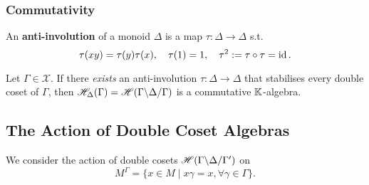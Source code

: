 \subsubsection{Commutativity}
An \textbf{anti-involution} of a monoid $\Delta$
is a map $\tau : \Delta\to\Delta$ s.t. \[\tau(xy) = \tau(y)\tau(x),\quad \tau(1) = 1,\quad \tau^2 := \tau\circ\tau = \operatorname{id}.\]
\begin{theorem}\label{hecke alg comm if anti involution}
    Let $\Gamma\in\mathscr{X}$.
    If there \textit{exists} an anti-involution $\tau : \Delta\to \Delta$ that stabilises every double coset of $\Gamma$, then $\mathscr{H}_\Delta(\Gamma) = \mathscr{H}({\Gamma}\backslash {\Delta}\slash {\Gamma})$ is a commutative $\mathbb{K}$-algebra.
\end{theorem}




\subsection{The Action of Double Coset Algebras}

We consider the action of double cosets $\mathscr{H}({\Gamma}\backslash {\Delta}\slash {\Gamma'})$ on \[M^\Gamma = \{x\in M\mid x\gamma = x, \forall \gamma\in\Gamma\}.\]

